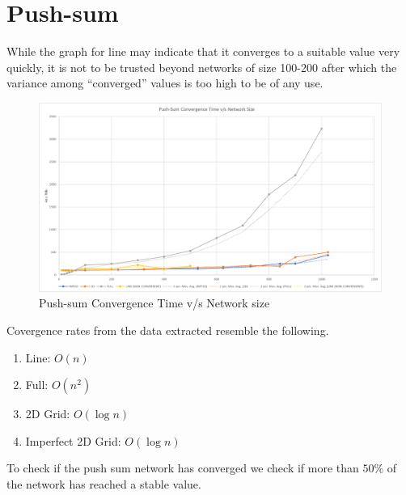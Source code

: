 \documentclass[a4paper, 10pt]{article}
\begin{document}
    \section{Push-sum}
    While the graph for line may indicate that it converges to a suitable value very quickly, it is not to be trusted beyond networks of size 100-200 after which the variance among ``converged'' values is too high to be of any use.

    \begin{figure}[h]
      \caption{Push-sum Convergence Time v/s Network size}
      \includegraphics[width=\textwidth]{project2_psum_chart}
    \end{figure}

    Covergence rates from the data extracted resemble the following.
    \begin{enumerate}
      \item{Line: $O(n)$}
      \item{Full: $O(n^2)$}
      \item{2D Grid: $O(\log n)$}
      \item{Imperfect 2D Grid: $O(\log n)$}
    \end{enumerate}

    To check if the push sum network has converged we check if more than $50\%$ of the network has reached a stable value.
\end{document}
